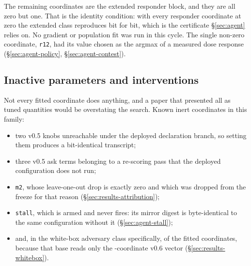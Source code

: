 \begin{table}[!ht]\centering
\caption{The twenty ask-score features and their deployed weights $w$, in the order of the feature
vector $\phi(a)$; the short names are those used in the source. The features are functions of the
approximate belief $\hat\mu$ and the public state, as described in \S\ref{sec:agent-policy}.}
\label{tab:askweights}
{\tabfont}
\end{table}

\noindent
The remaining coordinates are the extended responder block, and they are all zero but one. That is
the identity condition: with every responder coordinate at zero the extended class reproduces
\vsix{} bit for bit, which is the certificate \S\ref{sec:agent} relies on. No gradient or population
fit was run in this cycle. The single non-zero coordinate, \texttt{r12}, had its value chosen as the
argmax of a measured dose response (\S\ref{sec:agent-policy}, \S\ref{sec:agent-contest}).

\subsection*{Inactive parameters and interventions}

Not every fitted coordinate does anything, and a paper that presented all
\vsevenCoordinates{} as tuned quantities would be overstating the search. Known inert coordinates in
this family:

\begin{itemize}
\item two v0.5 knobs unreachable under the deployed declaration branch, so setting them produces a
      bit-identical transcript;
\item three v0.5 ask terms belonging to a re-scoring pass that the deployed configuration does
      not run;
\item \texttt{m2}, whose leave-one-out drop is exactly zero and which was dropped from the freeze
      for that reason (\S\ref{sec:results-attribution});
\item \texttt{stall}, which is armed and never fires: its mirror digest is byte-identical to the
      same configuration without it (\S\ref{sec:agent-stall});
\item and, in the white-box adversary class specifically, \vsevenZeightInert{} of the
      \vsevenCoordinates{} fitted coordinates, because that base reads only the
      \vsevenVsixCoords{}-coordinate v0.6 vector (\S\ref{sec:results-whitebox}).
\end{itemize}
